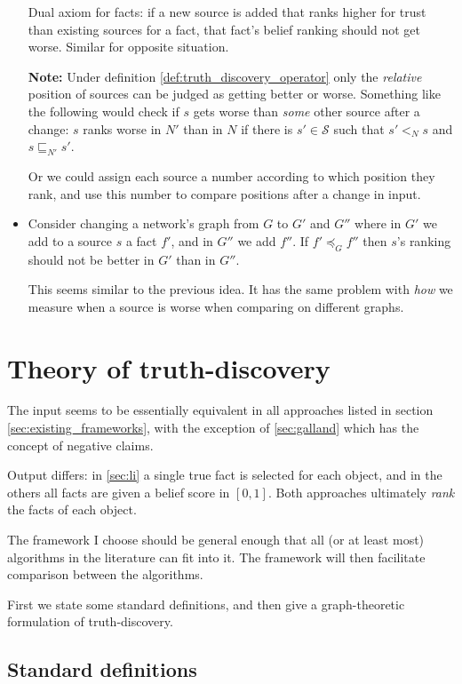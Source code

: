 \documentclass{article}
\theoremstyle{definition} \newtheorem{definition}{Definition}
\theoremstyle{definition} \newtheorem{example}{Example}
\theoremstyle{plain} \newtheorem{axiom}{Axiom}
\theoremstyle{plain} \newtheorem*{remark}{Remark}
\theoremstyle{remark} \newtheorem*{notation}{Notation}
\theoremstyle{plain} \newtheorem{lemma}{Lemma}
\theoremstyle{plain} \newtheorem{proposition}{Proposition}
\renewcommand{\S}{\mathcal{S}}  %
\newcommand{\sle}{\sqsubseteq}
\newcommand{\fle}{\preceq}
\begin{document}
\begin{itemize}
Dual axiom for facts: if a new source is added that ranks higher for trust than
existing sources for a fact, that fact's belief ranking should not get worse.
Similar for opposite situation.

\textbf{Note:} Under definition \ref{def:truth_discovery_operator} only the
\emph{relative} position of sources can be judged as getting better or worse.
Something like the following would check if $s$ gets worse than \emph{some}
other source after a change: $s$ ranks worse in $N'$ than in $N$ if there is
$s' \in \S$ such that $s' <_N s$ and $s \sle_{N'} s'$.

Or we could assign each source a number according to which position they rank,
and use this number to compare positions after a change in input.

\item Consider changing a network's graph from $G$ to $G'$ and $G''$ where in
$G'$ we add to a source $s$ a fact $f'$, and in $G''$ we add $f''$. If $f'
\fle_G f''$ then $s$'s ranking should not be better in $G'$ than in $G''$.

This seems similar to the previous idea. It has the same problem with
\emph{how} we measure when a source is worse when comparing on different graphs.

\end{itemize}

\section{Theory of truth-discovery}

The input seems to be essentially equivalent in all approaches listed in
section \ref{sec:existing_frameworks}, with the exception of \ref{sec:galland}
which has the concept of negative claims.

Output differs: in \ref{sec:li} a single true fact is selected for each object,
and in the others all facts are given a belief score in $[0, 1]$. Both
approaches ultimately \emph{rank} the facts of each object.

The framework I choose should be general enough that all (or at least most)
algorithms in the literature can fit into it. The framework will then
facilitate comparison between the algorithms.

First we state some standard definitions, and then give a graph-theoretic
formulation of truth-discovery.

\subsection{Standard definitions}
\end{document}
